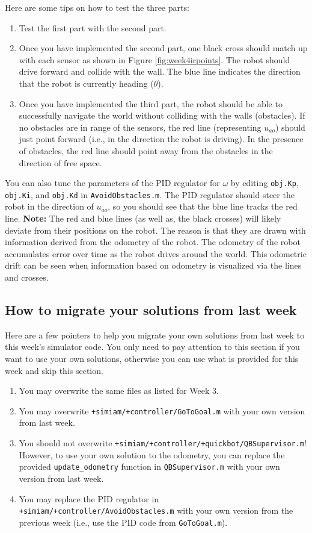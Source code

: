 \documentclass[10pt]{article}
\begin{document}
Here are some tips on how to test the three parts:

\begin{enumerate}
  \item Test the first part with the second part.
  \item Once you have implemented the second part, one black cross should match up with each sensor as shown in Figure \ref{fig:week4irpoints}. The robot should drive forward and collide with the wall. The blue line indicates the direction that the robot is currently heading ($\theta$).
  \item Once you have implemented the third part, the robot should be able to successfully navigate the world without colliding with the walls (obstacles). If no obstacles are in range of the sensors, the red line (representing $u_{ao}$) should just point forward (i.e., in the direction the robot is driving). In the presence of obstacles, the red line should point away from the obstacles in the direction of free space.
\end{enumerate}

You can also tune the parameters of the PID regulator for $\omega$ by editing \texttt{obj.Kp}, \texttt{obj.Ki}, and \texttt{obj.Kd} in \texttt{AvoidObstacles.m}. The PID regulator should steer the robot in the direction of $u_{ao}$, so you should see that the blue line tracks the red line. \textbf{Note:} The red and blue lines (as well as, the black crosses) will likely deviate from their positions on the robot. The reason is that they are drawn with information derived from the odometry of the robot. The odometry of the robot accumulates error over time as the robot drives around the world. This odometric drift can be seen when information based on odometry is visualized via the lines and crosses. 

\subsection*{How to migrate your solutions from last week}

Here are a few pointers to help you migrate your own solutions from last week to this week's simulator code. You only need to pay attention to this section if you want to use your own solutions, otherwise you can use what is provided for this week and skip this section.

\begin{enumerate}
 \item You may overwrite the same files as listed for Week 3.
 \item You may overwrite \texttt{+simiam/+controller/GoToGoal.m} with your own version from last week.
 \item You should not overwrite \texttt{+simiam/+controller/+quickbot/QBSupervisor.m}! However, to use your own solution to the odometry, you can replace the provided \texttt{update\_odometry} function in \texttt{QBSupervisor.m} with your own version from last week.
 \item You may replace the PID regulator in \texttt{+simiam/+controller/AvoidObstacles.m} with your own version from the previous week (i.e., use the PID code from \texttt{GoToGoal.m}).
\end{enumerate}
\end{document}
